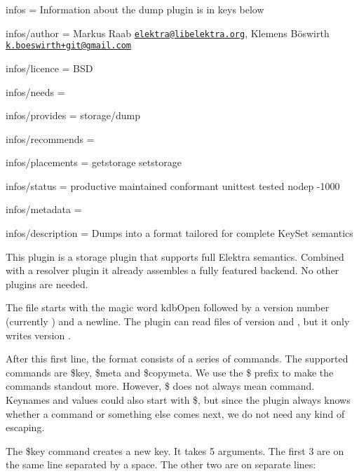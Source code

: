
\begin{DoxyItemize}
\item infos = Information about the dump plugin is in keys below
\item infos/author = Markus Raab \href{mailto:elektra@libelektra.org}{\tt elektra@libelektra.\+org}, Klemens Böswirth \href{mailto:k.boeswirth+git@gmail.com}{\tt k.\+boeswirth+git@gmail.\+com}
\item infos/licence = B\+SD
\item infos/needs =
\item infos/provides = storage/dump
\item infos/recommends =
\item infos/placements = getstorage setstorage
\item infos/status = productive maintained conformant unittest tested nodep -\/1000
\item infos/metadata =
\item infos/description = Dumps into a format tailored for complete Key\+Set semantics
\end{DoxyItemize}

This plugin is a storage plugin that supports full Elektra semantics. Combined with a resolver plugin it already assembles a fully featured backend. No other plugins are needed.

The file starts with the magic word {\ttfamily kdb\+Open} followed by a version number (currently {}) and a newline. The plugin can read files of version {} and {}, but it only writes version {}.

After this first line, the format consists of a series of commands. The supported commands are {\ttfamily \$key}, {\ttfamily \$meta} and {\ttfamily \$copymeta}. We use the {\ttfamily \$} prefix to make the commands standout more. However, {\ttfamily \$} does not always mean command. Keynames and values could also start with {\ttfamily \$}, but since the plugin always knows whether a command or something else comes next, we do not need any kind of escaping.

The {\ttfamily \$key} command creates a new key. It takes 5 arguments. The first 3 are on the same line separated by a space. The other two are on separate lines\+:




